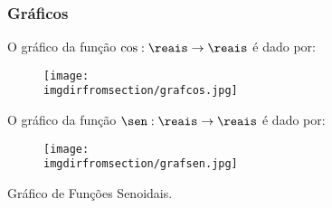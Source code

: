 \subsubsection{Gráficos}

\begin{example}
O gráfico da função $\cos : \reais \to \reais$ é dado por:
%
\begin{figure}
\centering
\texttt{[image: \\imgdirfromsection/grafcos.jpg]}
\end{figure}
\end{example}


\begin{example}
O gráfico da função $\sen: \reais \to \reais$ é dado por:
%
\begin{figure}
\centering 
\texttt{[image: \\imgdirfromsection/grafsen.jpg]}
\end{figure}
\end{example}

\begin{onlineact}
    {Gráfico de Funções Senoidais}.
\end{onlineact}